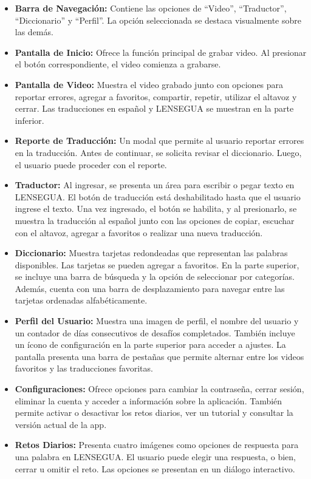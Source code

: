 \begin{itemize}
    \item \textbf{Barra de Navegación:} Contiene las opciones de ``Video'', ``Traductor'', ``Diccionario'' y ``Perfil''. La opción seleccionada se destaca visualmente sobre las demás.
    
    \item \textbf{Pantalla de Inicio:} Ofrece la función principal de grabar video. Al presionar el botón correspondiente, el video comienza a grabarse.
    
    \item \textbf{Pantalla de Video:} Muestra el video grabado junto con opciones para reportar errores, agregar a favoritos, compartir, repetir, utilizar el altavoz y cerrar. Las traducciones en español y LENSEGUA se muestran en la parte inferior.
    
    \item \textbf{Reporte de Traducción:} Un modal que permite al usuario reportar errores en la traducción. Antes de continuar, se solicita revisar el diccionario. Luego, el usuario puede proceder con el reporte.
    
    \item \textbf{Traductor:} Al ingresar, se presenta un área para escribir o pegar texto en LENSEGUA. El botón de traducción está deshabilitado hasta que el usuario ingrese el texto. Una vez ingresado, el botón se habilita, y al presionarlo, se muestra la traducción al español junto con las opciones de copiar, escuchar con el altavoz, agregar a favoritos o realizar una nueva traducción.
    
    \item \textbf{Diccionario:} Muestra tarjetas redondeadas que representan las palabras disponibles. Las tarjetas se pueden agregar a favoritos. En la parte superior, se incluye una barra de búsqueda y la opción de seleccionar por categorías. Además, cuenta con una barra de desplazamiento para navegar entre las tarjetas ordenadas alfabéticamente.
    
    \item \textbf{Perfil del Usuario:} Muestra una imagen de perfil, el nombre del usuario y un contador de días consecutivos de desafíos completados. También incluye un ícono de configuración en la parte superior para acceder a ajustes. La pantalla presenta una barra de pestañas que permite alternar entre los videos favoritos y las traducciones favoritas.
    
    \item \textbf{Configuraciones:} Ofrece opciones para cambiar la contraseña, cerrar sesión, eliminar la cuenta y acceder a información sobre la aplicación. También permite activar o desactivar los retos diarios, ver un tutorial y consultar la versión actual de la app.
    
    \item \textbf{Retos Diarios:} Presenta cuatro imágenes como opciones de respuesta para una palabra en LENSEGUA. El usuario puede elegir una respuesta, o bien, cerrar u omitir el reto. Las opciones se presentan en un diálogo interactivo.
\end{itemize}

